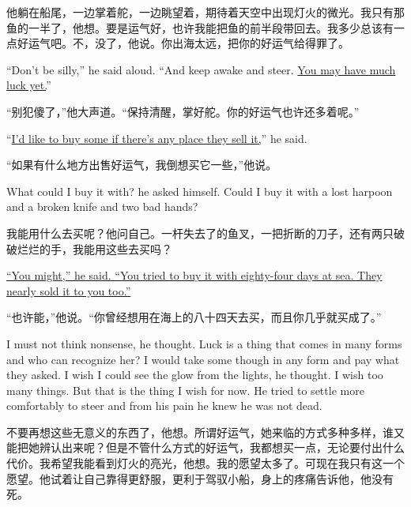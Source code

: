 \begin{paracol}{2}
\switchcolumn

他躺在船尾，一边掌着舵，一边眺望着，期待着天空中出现灯火的微光。我只有那鱼的一半了，他想。要是运气好，也许我能把鱼的前半段带回去。我多少总该有一点好运气吧。不，没了，他说。你出海太远，把你的好运气给得罪了。

\switchcolumn*

``Don't be silly,'' he said aloud. ``And keep awake and steer. \uline{You may have
much luck yet.}''

\switchcolumn

“别犯傻了，”他大声道。“保持清醒，掌好舵。你的好运气也许还多着呢。”

\switchcolumn*

``\uline{I'd like to buy some if there's any place they sell it,}'' he said.

\switchcolumn

“如果有什么地方出售好运气，我倒想买它一些，”他说。

\switchcolumn*

What could I buy it with? he asked himself. Could I buy it with a lost
harpoon and a broken knife and two bad hands?

\switchcolumn

我能用什么去买呢？他问自己。一杆失去了的鱼叉，一把折断的刀子，还有两只破破烂烂的手，我能用这些去买吗？

\switchcolumn*

\uline{``You might,'' he said. ``You tried to buy it with eighty-four days at sea.
They nearly sold it to you too.''}

\switchcolumn

“也许能，”他说。“你曾经想用在海上的八十四天去买，而且你几乎就买成了。”

\switchcolumn*

I must not think nonsense, he thought. Luck is a thing that comes in many
forms and who can \gls{recognize} her? I would take some though in any form
and pay what they asked. I wish I could see the glow from the lights, he
thought. I wish too many things. But that is the thing I wish for now. He
tried to settle more comfortably to steer and from his pain he knew he was
not dead.

\switchcolumn

不要再想这些无意义的东西了，他想。所谓好运气，她来临的方式多种多样，谁又能把她辨认出来呢？但是不管什么方式的好运气，我都想买一点，无论要付出什么代价。我希望我能看到灯火的亮光，他想。我的愿望太多了。可现在我只有这一个愿望。他试着让自己靠得更舒服，更利于驾驭小船，身上的疼痛告诉他，他没有死。


\end{paracol}
